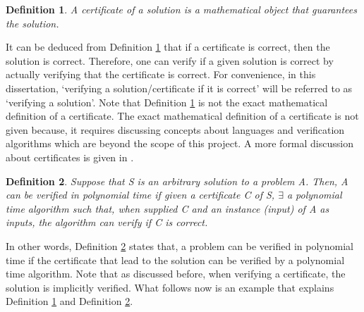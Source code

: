 \documentclass[12pt]{article}
\newtheorem{definition}{Definition}[subsection]
\numberwithin{equation}{subsection}
\numberwithin{table}{subsection}
\numberwithin{algorithm}{subsection}
\begin{document}
\begin{definition}
\label{certificate}
A certificate of a solution is a mathematical object that guarantees the solution.
\end{definition}
It can be deduced from Definition \ref{certificate} that if a certificate is correct, then the solution is correct. Therefore, one can verify if a given solution is correct by actually verifying that the certificate is correct. For convenience, in this dissertation, `verifying a solution/certificate if it is correct' will be referred to as `verifying a solution'. Note that Definition \ref{certificate} is not the exact mathematical definition of a certificate. The exact mathematical definition of a certificate is not given because, it requires discussing concepts about languages and verification algorithms which are beyond the scope of this project. A more formal discussion about certificates is given in \cite{cormen_leiserson_rivest_stein}.
\begin{definition}
\label{polynomial_time_verification}
Suppose that S is an arbitrary solution to a problem A. Then, A can be verified in polynomial time if given a certificate C of S, $\exists$ a polynomial time algorithm such that, when supplied C and an instance (input) of A as inputs, the algorithm can verify if C is correct. {}
\end{definition}
In other words, Definition \ref{polynomial_time_verification} states that, a problem can be verified in polynomial time if the certificate that lead to the solution can be verified by a polynomial time algorithm. Note that as discussed before, when verifying a certificate, the solution is implicitly verified. What follows now is an example that explains Definition \ref{certificate} and Definition \ref{polynomial_time_verification}.
\end{document}
